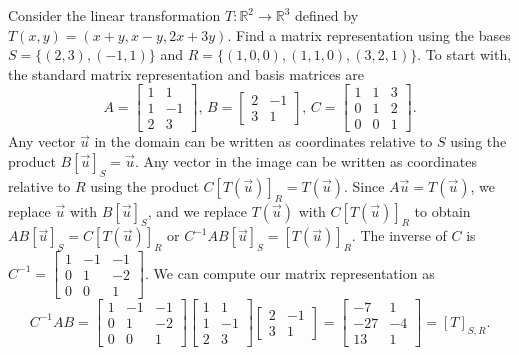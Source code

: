 \begin{example}
Consider the linear transformation $T\colon{\mathbb{R}}^2\to {\mathbb{R}}^3$ defined by $T(x,y)=(x+y,x-y,2x+3y)$. Find a matrix representation using the bases $S=\{(2,3),(-1,1)\}$ and $R=\{(1,0,0),(1,1,0),(3,2,1)\}$.  To start with, the standard matrix representation and basis matrices are 
$$
A=
\begin{bmatrix}
 1 & 1 \\
 1 & -1 \\
 2 & 3
\end{bmatrix},\,
B=
\begin{bmatrix}
 2 & -1 \\
 3 & 1
\end{bmatrix}
,\,
C=
\begin{bmatrix}
 1 & 1 & 3 \\
 0 & 1 & 2 \\
 0 & 0 & 1
\end{bmatrix}
.$$
Any vector $\vec u$ in the domain can be written as coordinates relative to $S$ using the product $ B[\vec u]_S=\vec u$.
Any vector in the image can be written as coordinates relative to $R$ using the product $C[T(\vec u)]_{R} = T(\vec u)$.  Since $A\vec u = T(\vec u)$, we replace $\vec u$ with $B[\vec u]_S$, and we replace $T(\vec u)$ with $C[T(\vec u)]_{R}$ to obtain $AB[\vec u]_S = C[T(\vec u)]_{R}$ or $C^{-1}AB[\vec u]_S=[T(\vec u)]_{R}$.  The inverse of $C$ is 
$
C^{-1}=
\begin{bmatrix}
 1 & -1 & -1 \\
 0 & 1 & -2 \\
 0 & 0 & 1
\end{bmatrix}
$.  
We can compute our matrix representation as 
$$C^{-1}AB = 
\begin{bmatrix}
 1 & -1 & -1 \\
 0 & 1 & -2 \\
 0 & 0 & 1
\end{bmatrix}
\begin{bmatrix}
 1 & 1 \\
 1 & -1 \\
 2 & 3
\end{bmatrix}
\begin{bmatrix}
 2 & -1 \\
 3 & 1
\end{bmatrix}
=
\begin{bmatrix}
 -7&1\\
 -27&-4\\
 13&1
\end{bmatrix}=[T]_{S,R}.
$$
\end{example}

